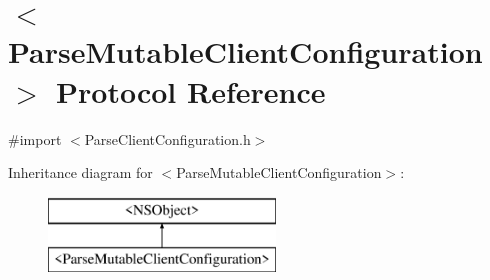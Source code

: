 \hypertarget{protocol_parse_mutable_client_configuration-p}{}\section{$<$Parse\+Mutable\+Client\+Configuration$>$ Protocol Reference}
\label{protocol_parse_mutable_client_configuration-p}


{\ttfamily \#import $<$Parse\+Client\+Configuration.\+h$>$}

Inheritance diagram for $<$Parse\+Mutable\+Client\+Configuration$>$\+:\begin{figure}[H]
\begin{center}
\leavevmode
\includegraphics[height=2.000000cm]{protocol_parse_mutable_client_configuration-p}
\end{center}
\end{figure}
